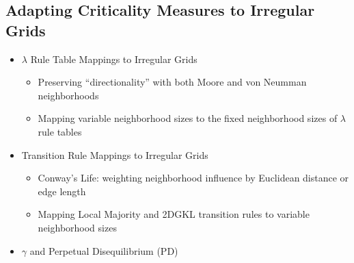 \documentclass[a4paper, 11pt]{article}
\begin{document}
\subsection*{Adapting Criticality Measures to Irregular Grids}
\begin{itemize}

\item $\lambda$ Rule Table Mappings to Irregular Grids
\begin{itemize}
\item Preserving ``directionality'' with both Moore and von Neumman neighborhoods
\item Mapping variable neighborhood sizes to the fixed neighborhood sizes of $\lambda$ rule tables
\end{itemize}

\item Transition Rule Mappings to Irregular Grids
\begin{itemize}
\item Conway's Life: weighting neighborhood influence by Euclidean distance or edge length
\item Mapping Local Majority and 2DGKL transition rules to variable neighborhood sizes
\end{itemize}

\item $\gamma$ and Perpetual Disequilibrium (PD)

\end{itemize}
\end{document}
